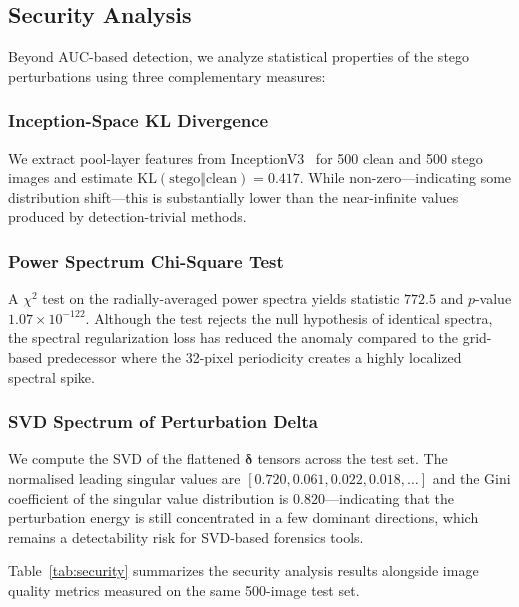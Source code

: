 \documentclass[journal]{IEEEtran}
\begin{document}
\subsection{Security Analysis}
\label{sec:security}

Beyond AUC-based detection, we analyze statistical properties of the stego perturbations
using three complementary measures:

\subsubsection{Inception-Space KL Divergence}
We extract pool-layer features from InceptionV3~\cite{heusel2017gans} for 500 clean and 500
stego images and estimate $\mathrm{KL}(\text{stego}\Vert\text{clean})=0.417$.
While non-zero---indicating some distribution shift---this is substantially lower than
the near-infinite values produced by detection-trivial methods.

\subsubsection{Power Spectrum Chi-Square Test}
A $\chi^2$ test on the radially-averaged power spectra yields statistic $772.5$ and
$p$-value $1.07\times10^{-122}$.
Although the test rejects the null hypothesis of identical spectra, the spectral regularization
loss has reduced the anomaly compared to the grid-based predecessor where the 32-pixel
periodicity creates a highly localized spectral spike.

\subsubsection{SVD Spectrum of Perturbation Delta}
We compute the SVD of the flattened $\bm{\delta}$ tensors across the test set.
The normalised leading singular values are $[0.720, 0.061, 0.022, 0.018, \ldots]$ and the
Gini coefficient of the singular value distribution is $0.820$---indicating that the
perturbation energy is still concentrated in a few dominant directions, which remains a
detectability risk for SVD-based forensics tools.

Table~\ref{tab:security} summarizes the security analysis results alongside image quality
metrics measured on the same 500-image test set.
\end{document}

